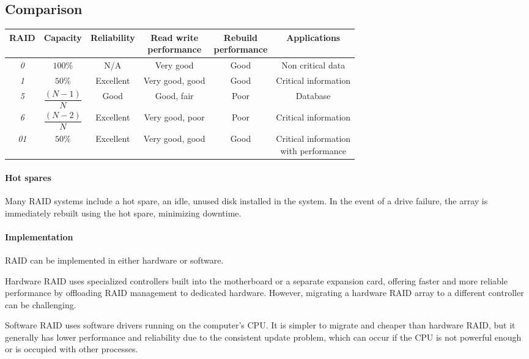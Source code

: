 \subsection{Comparison}
\begin{table}[H]
    \centering
    \begin{tabular}{|c|ccccc|}
    \hline
    \textbf{RAID} & \textbf{Capacity} & \textbf{Reliability} & \makecell{\textbf{Read write} \\\textbf{performance}} & \makecell{\textbf{Rebuild} \\\textbf{performance}} & \textbf{Applications}                 \\ \hline
    \textit{0}    & $100\%$           & N/A                  & Very good                       & Good                         & Non critical data                     \\
    \textit{1}    & $50\%$            & Excellent            & Very good, good                 & Good                         & Critical information                  \\
    \textit{5}    & $\dfrac{\left(N-1\right)}{N}$   & Good                 & Good, fair                      & Poor                         & Database                              \\
    \textit{6}    & $\dfrac{\left(N-2\right)}{N}$   & Excellent            & Very good, poor                 & Poor                         & Critical information                  \\
    \textit{01}   & $50\%$            & Excellent            & Very good, good                 & Good                         & \makecell{Critical information \\ with performance} \\ \hline
    \end{tabular}
\end{table}
\renewcommand*{\arraystretch}{1}

\paragraph*{Hot spares}
Many RAID systems include a hot spare, an idle, unused disk installed in the system. 
In the event of a drive failure, the array is immediately rebuilt using the hot spare, minimizing downtime.

\paragraph*{Implementation}
RAID can be implemented in either hardware or software.

Hardware RAID uses specialized controllers built into the motherboard or a separate expansion card, offering faster and more reliable performance by offloading RAID management to dedicated hardware. 
However, migrating a hardware RAID array to a different controller can be challenging.

Software RAID uses software drivers running on the computer's CPU. 
It is simpler to migrate and cheaper than hardware RAID, but it generally has lower performance and reliability due to the consistent update problem, which can occur if the CPU is not powerful enough or is occupied with other processes.